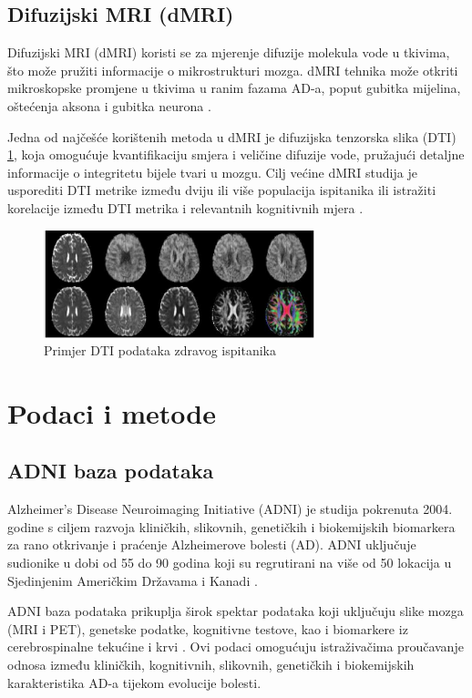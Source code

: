 \documentclass[zavrsnirad]{fer}
\begin{document}
\subsection{Difuzijski MRI (dMRI)}
Difuzijski MRI (dMRI) koristi se za mjerenje difuzije molekula vode u tkivima, što može pružiti informacije o mikrostrukturi mozga. dMRI tehnika može otkriti mikroskopske promjene u tkivima u ranim fazama AD-a, poput gubitka mijelina, oštećenja aksona i gubitka neurona \cite{Promteangtrong2015}.

Jedna od najčešće korištenih metoda u dMRI je difuzijska tenzorska slika (DTI) \ref{fig:dMRI}, koja omogućuje kvantifikaciju smjera i veličine difuzije vode, pružajući detaljne informacije o integritetu bijele tvari u mozgu. Cilj većine dMRI studija je usporediti DTI metrike između dviju ili više populacija ispitanika ili istražiti korelacije između DTI metrika i relevantnih kognitivnih mjera \cite{mueller2015diffusion}.

\begin{figure}[h]
	\centering
	\includegraphics[width=0.7\textwidth]{Figures/dMRI.jpg}
	\caption{Primjer DTI podataka zdravog ispitanika \cite{mueller2015diffusion}}
	\label{fig:dMRI}
\end{figure}

\section{Podaci i metode}
\subsection{ADNI baza podataka}
Alzheimer's Disease Neuroimaging Initiative (ADNI) je studija pokrenuta 2004. godine s ciljem razvoja kliničkih, slikovnih, genetičkih i biokemijskih biomarkera za rano otkrivanje i praćenje Alzheimerove bolesti (AD). ADNI uključuje sudionike u dobi od 55 do 90 godina koji su regrutirani na više od 50 lokacija u Sjedinjenim Američkim Državama i Kanadi \cite{adni_about}. 

ADNI baza podataka prikuplja širok spektar podataka koji uključuju slike mozga (MRI i PET), genetske podatke, kognitivne testove, kao i biomarkere iz cerebrospinalne tekućine i krvi \cite{adni_about}. Ovi podaci omogućuju istraživačima proučavanje odnosa između kliničkih, kognitivnih, slikovnih, genetičkih i biokemijskih karakteristika AD-a tijekom evolucije bolesti.
\end{document}
